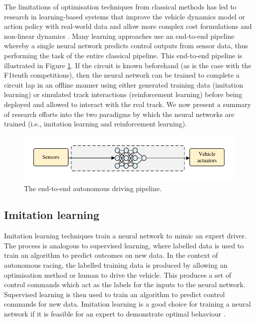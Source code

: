 The limitations of optimisation techniques from classical methods has led to research in learning-based systems that improve the vehicle dynamics model or action policy with real-world data and allow more complex cost formulations and non-linear dynamics \cite{Fuchs2021}.
Many learning approaches use an end-to-end pipeline whereby a single neural network predicts control outputs from sensor data, thus performing the task of the entire classical pipeline.
This end-to-end pipeline is illustrated in Figure \ref{fig:end_to_end}.
If the circuit is known beforehand (as is the case with the F1tenth competitions), then the neural network can be trained to complete a circuit lap in an offline manner using either generated training data (imitation learning) or simulated track interactions (reinforcement learning) before being deployed and allowed to interact with the real track.
We now present a summary of research efforts into the two paradigms by which the neural networks are trained (i.e., imitation learning and reinforcement learning).

\begin{figure}[htb!]
    \centering
    \includegraphics{contents/chapt1/figs/end_to_end.pdf}
    \caption{The end-to-end autonomous driving pipeline.}
    \label{fig:end_to_end}
\end{figure}

\subsection{Imitation learning}
\label{sec:imitation_learning}

Imitation learning techniques train a neural network to mimic an expert driver.
The process is analogous to supervised learning, where labelled data is used to train an algorithm to predict outcomes on new data.
In the context of autonomous racing, the labelled training data is produced by allowing an optimisation method or human to drive the vehicle.
This produces a set of control commands which act as the labels for the inputs to the neural network.
Supervised learning is then used to train an algorithm to predict control commands for new data.
Imitation learning is a good choice for training a neural network if it is feasible for an expert to demonstrate optimal behaviour \cite{Osa_2018}.

